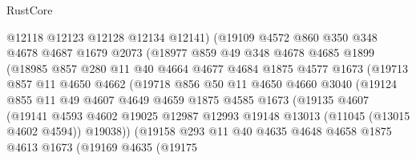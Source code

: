 \begin{lexlean}{RustCore}
\begin{coremodule}
                    @12118
                    @12123
                    @12128
                    @12134
                    @12141)
                  (@19109
                    @4572
                    @860
                    @350
                    @348
                    @4678
                    @4687
                    @1679
                    @2073
                    (@18977
                      @859
                      @49
                      @348
                      @4678
                      @4685
                      @1899
                      (@18985
                        @857
                        @280
                        @11
                        @40
                        @4664
                        @4677
                        @4684
                        @1875
                        @4577
                        @1673
                        (@19713
                          @857
                          @11
                          @4650
                          @4662
                          (@19718
                            @856
                            @50
                            @11
                            @4650
                            @4660
                            @3040
                            (@19124
                              @855
                              @11
                              @49
                              @4607
                              @4649
                              @4659
                              @1875
                              @4585
                              @1673
                              (@19135
                                @4607
                                (@19141
                                  @4593
                                  @4602
                                  @19025
                                  @12987
                                  @12993
                                  @19148
                                  @13013
                                  (@11045 (@13015 @4602 @4594))
                                  @19038))
                              (@19158
                                @293
                                @11
                                @40
                                @4635
                                @4648
                                @4658
                                @1875
                                @4613
                                @1673
                                (@19169
                                  @4635
                                  (@19175

\end{coremodule}
\end{lexlean}
